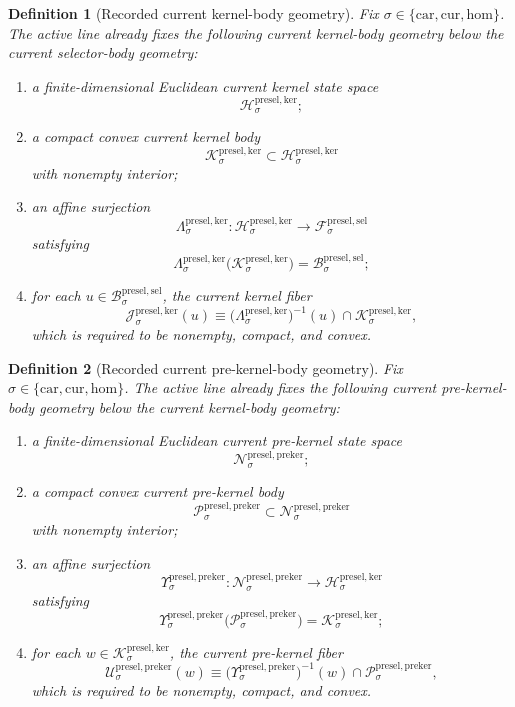\documentclass[11pt]{article}
\newcommand{\Car}{\mathrm{car}}
\newcommand{\Cur}{\mathrm{cur}}
\newcommand{\Hom}{\mathrm{hom}}
\newcommand{\PreSectionSelectorSpace}[1]{\mathcal F_{#1}^{\mathrm{presel,sel}}}
\newcommand{\PreSectionSelectorBody}[1]{\mathcal B_{#1}^{\mathrm{presel,sel}}}
\newcommand{\KernelSpace}[1]{\mathcal H_{#1}^{\mathrm{presel,ker}}}
\newcommand{\KernelBody}[1]{\mathcal K_{#1}^{\mathrm{presel,ker}}}
\newcommand{\KernelProj}[1]{\Lambda_{#1}^{\mathrm{presel,ker}}}
\newcommand{\KernelFiber}[2]{\mathcal J_{#1}^{\mathrm{presel,ker}}(#2)}
\newcommand{\PreKernelSpace}[1]{\mathcal N_{#1}^{\mathrm{presel,preker}}}
\newcommand{\PreKernelBody}[1]{\mathcal P_{#1}^{\mathrm{presel,preker}}}
\newcommand{\PreKernelProj}[1]{\Upsilon_{#1}^{\mathrm{presel,preker}}}
\newcommand{\PreKernelFiber}[2]{\mathcal U_{#1}^{\mathrm{presel,preker}}(#2)}
\newtheorem{definition}{Definition}
\begin{document}
\begin{definition}[Recorded current kernel-body geometry]
\label{def:kernelgeometry}
Fix \(\sigma\in\{\Car,\Cur,\Hom\}\). The active line already fixes the following current kernel-body geometry below the current selector-body geometry:
\begin{enumerate}
    \item a finite-dimensional Euclidean current kernel state space
    \[
    \KernelSpace{\sigma};
    \]
    \item a compact convex current kernel body
    \[
    \KernelBody{\sigma}\subset\KernelSpace{\sigma}
    \]
    with nonempty interior;
    \item an affine surjection
    \[
    \KernelProj{\sigma}:\KernelSpace{\sigma}\to\PreSectionSelectorSpace{\sigma}
    \]
    satisfying
    \[
    \KernelProj{\sigma}\bigl(\KernelBody{\sigma}\bigr)
    =
    \PreSectionSelectorBody{\sigma};
    \]
    \item for each \(u\in\PreSectionSelectorBody{\sigma}\), the current kernel fiber
    \[
    \KernelFiber{\sigma}{u}
    \equiv
    \bigl(\KernelProj{\sigma}\bigr)^{-1}(u)\cap\KernelBody{\sigma},
    \]
    which is required to be nonempty, compact, and convex.
\end{enumerate}
\end{definition}

\begin{definition}[Recorded current pre-kernel-body geometry]
\label{def:prekernelgeometry}
Fix \(\sigma\in\{\Car,\Cur,\Hom\}\). The active line already fixes the following current pre-kernel-body geometry below the current kernel-body geometry:
\begin{enumerate}
    \item a finite-dimensional Euclidean current pre-kernel state space
    \[
    \PreKernelSpace{\sigma};
    \]
    \item a compact convex current pre-kernel body
    \[
    \PreKernelBody{\sigma}\subset\PreKernelSpace{\sigma}
    \]
    with nonempty interior;
    \item an affine surjection
    \[
    \PreKernelProj{\sigma}:\PreKernelSpace{\sigma}\to\KernelSpace{\sigma}
    \]
    satisfying
    \[
    \PreKernelProj{\sigma}\bigl(\PreKernelBody{\sigma}\bigr)
    =
    \KernelBody{\sigma};
    \]
    \item for each \(w\in\KernelBody{\sigma}\), the current pre-kernel fiber
    \[
    \PreKernelFiber{\sigma}{w}
    \equiv
    \bigl(\PreKernelProj{\sigma}\bigr)^{-1}(w)\cap\PreKernelBody{\sigma},
    \]
    which is required to be nonempty, compact, and convex.
\end{enumerate}
\end{definition}
\end{document}
